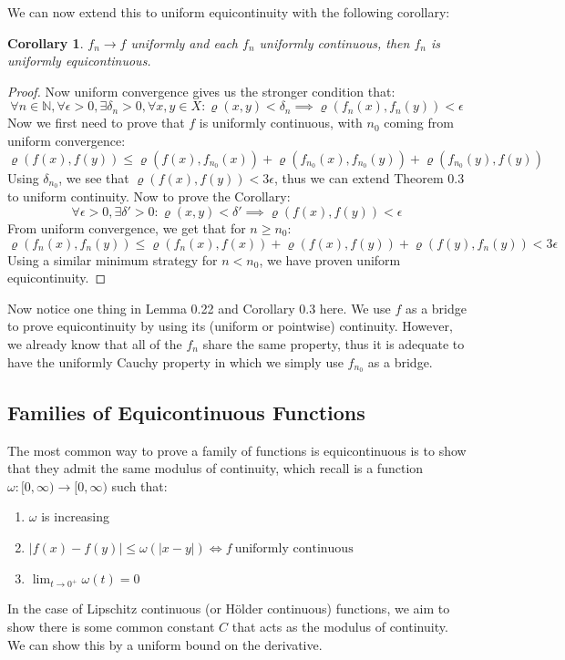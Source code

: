 \documentclass[10pt,letterpaper]{article} %
\newtheorem{cor}{Corollary}[section]
\begin{document}
We can now extend this to uniform equicontinuity with the following corollary:
\begin{cor}
$f_n \xrightarrow{} f$ uniformly and each $f_n$ uniformly continuous, then $f_n$ is uniformly equicontinuous.
\end{cor}
\begin{proof}
Now uniform convergence gives us the stronger condition that:
\begin{equation*}
  \forall n \in \mathbb{N}, \forall \epsilon > 0, \exists \delta_n > 0, \forall x, y \in X: \varrho(x, y) < \delta_n \implies \varrho(f_n(x), f_n(y)) < \epsilon
\end{equation*}
Now we first need to prove that $f$ is uniformly continuous, with $n_0$ coming from uniform convergence:
\begin{equation*}
  \varrho(f(x), f(y)) \leqslant \varrho(f(x), f_{n_0}(x)) + \varrho(f_{n_0}(x), f_{n_0}(y)) + \varrho(f_{n_0}(y), f(y))
\end{equation*}
Using $\delta_{n_0}$, we see that $\varrho(f(x), f(y)) < 3\epsilon$, thus we can extend Theorem 0.3 to uniform continuity. Now to prove the Corollary:
\begin{equation*}
\forall \epsilon > 0, \exists \delta' > 0: \varrho(x, y) < \delta' \implies \varrho(f(x), f(y)) < \epsilon
\end{equation*}
From uniform convergence, we get that for $n \geqslant n_0$:
\begin{equation*}
  \varrho(f_n(x), f_n(y)) \leqslant \varrho(f_n(x), f(x)) + \varrho(f(x), f(y)) + \varrho(f(y), f_n(y)) < 3\epsilon
\end{equation*}
Using a similar minimum strategy for $n < n_0$, we have proven uniform equicontinuity.
\end{proof}

Now notice one thing in Lemma 0.22 and Corollary 0.3 here. We use $f$ as a bridge to prove equicontinuity by using its (uniform or pointwise) continuity. However, we already know that all of the $f_n$ share the same property, thus it is adequate to have the uniformly Cauchy property in which we simply use $f_{n_0}$ as a bridge.

\subsection{Families of Equicontinuous Functions}
The most common way to prove a family of functions is equicontinuous is to show that they admit the same modulus of continuity, which recall is a function $\omega: [0, \infty) \xrightarrow{} [0, \infty)$ such that:
\begin{enumerate}
  \item $\omega$ is increasing
  \item $|f(x) - f(y)| \leqslant \omega(|x-y|) \iff f \ \text{uniformly continuous}$
  \item $\lim_{t \xrightarrow{} 0^+} \omega(t) = 0$
\end{enumerate}
In the case of Lipschitz continuous (or H\"older continuous) functions, we aim to show there is some common constant $C$ that acts as the modulus of continuity. We can show this by a uniform bound on the derivative.\\
\end{document}
